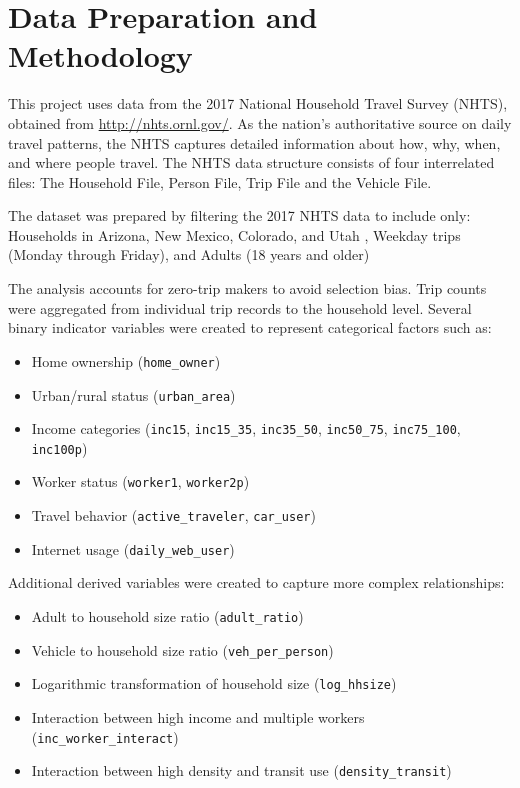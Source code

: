 \documentclass[12pt]{article}
\begin{document}
\section{Data Preparation and Methodology}
This project uses data from the 2017 National Household Travel Survey (NHTS), obtained from \href{http://nhts.ornl.gov/}{http://nhts.ornl.gov/}. As the nation's authoritative source on daily travel patterns, the NHTS captures detailed information about how, why, when, and where people travel. The NHTS data structure consists of four interrelated files: The Household File, Person File, Trip File and the Vehicle File. 

The dataset was prepared by filtering the 2017 NHTS data to include only: Households in Arizona, New Mexico, Colorado, and Utah , Weekday trips (Monday through Friday), and Adults (18 years and older)


The analysis accounts for zero-trip makers to avoid selection bias. Trip counts were aggregated from individual trip records to the household level. Several binary indicator variables were created to represent categorical factors such as:
\begin{itemize}
    \item Home ownership (\texttt{home\_owner})
    \item Urban/rural status (\texttt{urban\_area})
    \item Income categories (\texttt{inc15}, \texttt{inc15\_35}, \texttt{inc35\_50}, \texttt{inc50\_75}, \texttt{inc75\_100}, \texttt{inc100p})
    \item Worker status (\texttt{worker1}, \texttt{worker2p})
    \item Travel behavior (\texttt{active\_traveler}, \texttt{car\_user})
    \item Internet usage (\texttt{daily\_web\_user})
\end{itemize}

Additional derived variables were created to capture more complex relationships:
\begin{itemize}
    \item Adult to household size ratio (\texttt{adult\_ratio})
    \item Vehicle to household size ratio (\texttt{veh\_per\_person})
    \item Logarithmic transformation of household size (\texttt{log\_hhsize})
    \item Interaction between high income and multiple workers (\texttt{inc\_worker\_interact})
    \item Interaction between high density and transit use (\texttt{density\_transit})
\end{itemize}
\end{document}
